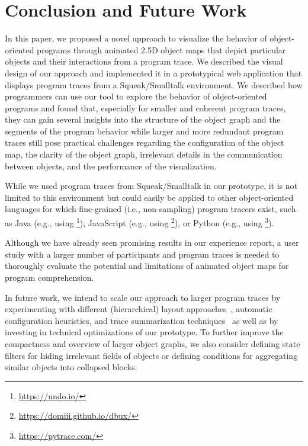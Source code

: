 \section{Conclusion and Future Work}
\label{sec:conclusion}

In this paper, we proposed a novel approach to visualize the behavior of object-oriented programs through animated 2.5D object maps that depict particular objects and their interactions from a program trace.
We described the visual design of our approach and implemented it in a prototypical web application that displays program traces from a Squeak/Smalltalk environment.
We described how programmers can use our tool to explore the behavior of object-oriented programs and found that, especially for smaller and coherent program traces, they can gain several insights into the structure of the object graph and the segments of the program behavior while larger and more redundant program traces still pose practical challenges regarding the configuration of the object map, the clarity of the object graph, irrelevant details in the communication between objects, and the performance of the visualization.

While we used program traces from Squeak/Smalltalk in our prototype, it is not limited to this environment but could easily be applied to other object-oriented languages for which fine-grained (i.e., non-sampling) program tracers exist, such as Java (e.g., using \footnote{\url{https://undo.io/}}), JavaScript (e.g., using \footnote{\url{https://domiii.github.io/dbux/}}), or Python (e.g., using \footnote{\url{https://pytrace.com/}}).

Although we have already seen promising results in our experience report, a user study with a larger number of participants and program traces is needed to thoroughly evaluate the potential and limitations of animated object maps for program comprehension.

In future work, we intend to scale our approach to larger program traces by experimenting with different (hierarchical) layout approaches~\cite{kuhn2008consistent,atzberger2023visualization}, automatic configuration heuristics, and trace summarization techniques~\cite{hamouLhadj2006summarizing,noda2017identifying} as well as by investing in technical optimizations of our prototype.
To further improve the compactness and overview of larger object graphs, we also consider defining state filters for hiding irrelevant fields of objects or defining conditions for aggregating similar objects into collapsed blocks.

